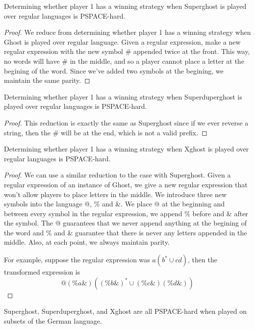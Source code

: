 \documentclass[runningheads,a4paper]{llncs}
\begin{document}
\begin{corollary}
Determining whether player 1 has a winning strategy when Superghost is played over regular languages is PSPACE-hard. 
\end{corollary}

\begin{proof}
We reduce from determining whether player 1 has a winning strategy when Ghost is played over regular language. Given a regular expression, make a new regular expression with the new symbol \# appended twice at the front. This way, no words will have \# in the middle, and so a player cannot place a letter at the begining of the word. Since we've added two symbols at the begining, we maintain the same parity.
\end{proof} 

\begin{corollary}
Determining whether player 1 has a winning strategy when Superduperghost is played over regular languages is PSPACE-hard.
\end{corollary}

\begin{proof}
This reduction is exactly the same as Superghost since if we ever reverse a string, then the \# will be at the end, which is not a valid prefix. 
\end{proof}

\begin{corollary}
Determining whether player 1 has a winning strategy when Xghost is played over regular languages is PSPACE-hard. 
\end{corollary}

\begin{proof}
We can use a similar reduction to the case with Superghost. Given a regular expression of an instance of Ghost, we give a new regular expression that won't allow players to place letters in the middle. We introduce three new symbols into the language @, \% and \&. We place @ at the beginning and between every symbol in the regular expression, we append \% before and \& after the symbol. The @ guarantees that we never append anything at the begining of the word and \% and \& guarantee that there is never any letters appended in the middle. Also, at each point, we always maintain parity.

For example, suppose the regular expression was $a(b^* \cup cd)$, then the transformed expression is
\[ @(\%a\&)((\%b\&)^* \cup (\%c\&)(\%d\&)) \]
\end{proof}

\begin{corollary}
Superghost, Superduperghost, and Xghost are all PSPACE-hard when played on subsets of the German language.
\end{corollary}
\end{document}

